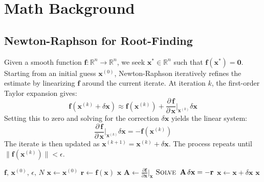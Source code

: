 \documentclass{article}
\newcommand{\pd}[2]{\dfrac{\partial\, #1}{\partial\, #2}}
\newcommand{\pdc}[2]{\frac{\partial #1}{\partial #2}}
\begin{document}
\section{Math Background}
\label{sec:math}

\subsection{Newton-Raphson for Root-Finding}
\label{sec:newton_raphson}

Given a smooth function $\mathbf{f} : \mathbb{R}^n \to \mathbb{R}^n$, we seek $\mathbf{x}^* \in \mathbb{R}^n$ such that $\mathbf{f}(\mathbf{x}^*) = \mathbf{0}$. Starting from an initial guess $\mathbf{x}^{(0)}$, Newton-Raphson iteratively refines the estimate by linearizing $\mathbf{f}$ around the current iterate. At iteration $k$, the first-order Taylor expansion gives:
%
\begin{equation}
    \mathbf{f}(\mathbf{x}^{(k)} + \delta \mathbf{x}) \approx \mathbf{f}(\mathbf{x}^{(k)}) + \pd{\mathbf{f}}{\mathbf{x}}\bigg|_{\mathbf{x}^{(k)}} \delta \mathbf{x}
\end{equation}
%
Setting this to zero and solving for the correction $\delta \mathbf{x}$ yields the linear system:
%
\begin{equation}
    \pd{\mathbf{f}}{\mathbf{x}}\bigg|_{\mathbf{x}^{(k)}} \delta \mathbf{x} = -\mathbf{f}(\mathbf{x}^{(k)})
\end{equation}
%
The iterate is then updated as $\mathbf{x}^{(k+1)} = \mathbf{x}^{(k)} + \delta \mathbf{x}$. The process repeats until $\|\mathbf{f}(\mathbf{x}^{(k)})\| < \epsilon$.

\begin{algorithm}[H]
\caption{Newton-Raphson Root-Finding}
\label{alg:newton_raphson}
\begin{algorithmic}[1]
\addtolength{\itemsep}{0.5ex}
{$\mathbf{f},\, \mathbf{x}^{(0)},\, \epsilon,\, N$}
    \State $\mathbf{x} \gets \mathbf{x}^{(0)}$
        \State $\mathbf{r} \gets \mathbf{f}(\mathbf{x})$
            \State \Return $\mathbf{x}$
        \EndIf
        \State $\mathbf{A} \gets \pdc{\mathbf{f}}{\mathbf{x}}\big|_{\mathbf{x}}$
        \State $\textsc{Solve}\;\; \mathbf{A}\, \delta\mathbf{x} = -\mathbf{r}$
        \State $\mathbf{x} \gets \mathbf{x} + \delta\mathbf{x}$
    \EndFor
    \State \Return $\mathbf{x}$
\EndFunction
\end{algorithmic}
\end{algorithm}
\end{document}
